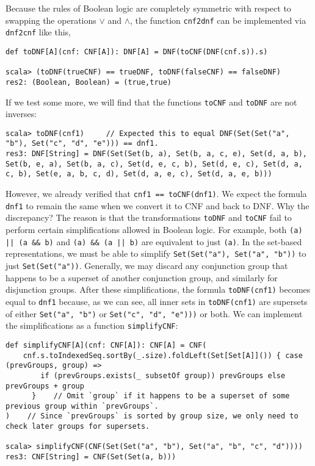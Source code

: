 Because the rules of Boolean logic are completely symmetric with respect
to swapping the operations $\vee$ and $\wedge$, the function \lstinline!cnf2dnf!
can be implemented via \lstinline!dnf2cnf! like this,
\begin{lstlisting}
def toDNF[A](cnf: CNF[A]): DNF[A] = DNF(toCNF(DNF(cnf.s)).s)

scala> (toDNF(trueCNF) == trueDNF, toDNF(falseCNF) == falseDNF)
res2: (Boolean, Boolean) = (true,true)
\end{lstlisting}

If we test some more, we will find that the functions \lstinline!toCNF!
and \lstinline!toDNF! are not inverses:
\begin{lstlisting}
scala> toDNF(cnf1)     // Expected this to equal DNF(Set(Set("a", "b"), Set("c", "d", "e"))) == dnf1.
res3: DNF[String] = DNF(Set(Set(b, a), Set(b, a, c, e), Set(d, a, b), Set(b, e, a), Set(b, a, c), Set(d, e, c, b), Set(d, e, c), Set(d, a, c, b), Set(e, a, b, c, d), Set(d, a, e, c), Set(d, a, e, b)))
\end{lstlisting}
However, we already verified that \lstinline!cnf1 == toCNF(dnf1)!.
We expect the formula \lstinline!dnf1! to remain the same when we
convert it to CNF and back to DNF. Why the discrepancy? The reason
is that the transformations \lstinline!toDNF! and \lstinline!toCNF!
fail to perform certain simplifications allowed in Boolean logic.
For example, both \lstinline!(a) || (a && b)! and \lstinline!(a) && (a || b)!
are equivalent to just \lstinline!(a)!. In the set-based representations,
we must be able to simplify \lstinline!Set(Set("a"), Set("a", "b"))!
to just \lstinline!Set(Set("a"))!. Generally, we may discard any
conjunction group that happens to be a superset of another conjunction
group, and similarly for disjunction groups. After these simplifications,
the formula \lstinline!toDNF(cnf1)! becomes equal to \lstinline!dnf1!
because, as we can see, all inner sets in \lstinline!toDNF(cnf1)!
are supersets of either \lstinline!Set("a", "b")! or \lstinline!Set("c", "d", "e")))!
or both. We can implement the simplifications as a function \lstinline!simplifyCNF!:
\begin{lstlisting}
def simplifyCNF[A](cnf: CNF[A]): CNF[A] = CNF(
    cnf.s.toIndexedSeq.sortBy(_.size).foldLeft(Set[Set[A]]()) { case (prevGroups, group) =>
        if (prevGroups.exists(_ subsetOf group)) prevGroups else prevGroups + group
      }    // Omit `group` if it happens to be a superset of some previous group within `prevGroups`.
)    // Since `prevGroups` is sorted by group size, we only need to check later groups for supersets.

scala> simplifyCNF(CNF(Set(Set("a", "b"), Set("a", "b", "c", "d"))))
res3: CNF[String] = CNF(Set(Set(a, b)))
\end{lstlisting}
